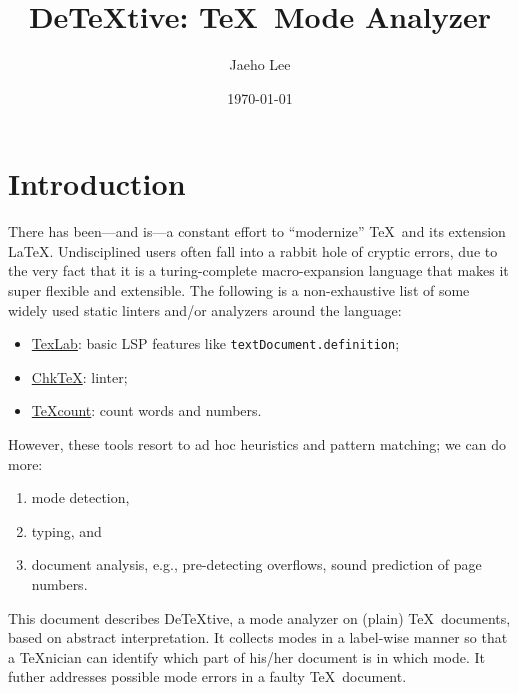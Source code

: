 \documentclass[a4paper]{article}
\title{De\TeX{}tive: \TeX\ Mode Analyzer}
\author{Jaeho Lee}
\date{\today}
\begin{document}
\maketitle

\begin{center}
\end{center}

\tableofcontents

\section{Introduction}
There has been---and is---a constant effort to ``modernize'' \TeX\ and its extension \LaTeX.
Undisciplined users often fall into a rabbit hole of cryptic errors, due to the very fact that it is a turing-complete macro-expansion language that makes it super flexible and extensible.
The following is a non-exhaustive list of some widely used static linters and/or analyzers around the language:
\begin{itemize}
\item \href{https://github.com/latex-lsp/texlab}{TexLab}: basic LSP features like \verb/textDocument.definition/;
\item \href{https://www.nongnu.org/chktex/}{Chk\TeX}: linter;
\item \href{https://app.uio.no/ifi/texcount/}{\TeX{}count}: count words and numbers.
\end{itemize}
However, these tools resort to ad hoc heuristics and pattern matching; we can do more:
\begin{enumerate}
\item mode detection,
\item typing, and
\item document analysis, e.g., pre-detecting overflows, sound prediction of page numbers.
\end{enumerate}

This document describes De\TeX{}tive, a mode analyzer on (plain) \TeX\ documents, based on abstract interpretation\cite{itsa}.
It collects modes in a label-wise manner so that a \TeX{}nician can identify which part of his/her document is in which mode.
It futher addresses possible mode errors in a faulty \TeX\ document.
\end{document}
